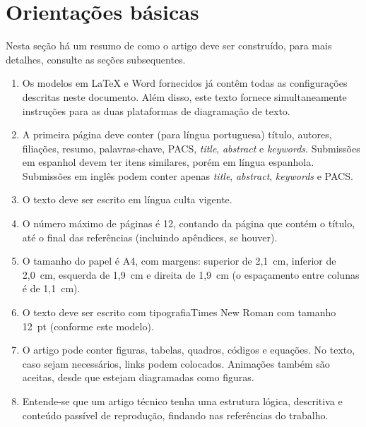 \documentclass[12pt, a4paper, twoside, twocolumn]{article}
\begin{document}
\section{Orientações básicas}

Nesta seção há um resumo de como o artigo deve ser construído, para mais detalhes, consulte as seções subsequentes.

\vspace{-8pt}
\begin{enumerate} \itemsep=2pt
    \item Os modelos em LaTeX e Word fornecidos já contêm todas as configurações descritas neste documento. Além disso, este texto fornece simultaneamente instruções para as duas plataformas de diagramação de texto.
	\item A primeira página deve conter (para língua portuguesa) título, autores, filiações, resumo, palavras-chave, PACS, \textit{title}, \textit{abstract} e \textit{keywords}.
	Submissões em espanhol devem ter itens similares, porém em língua espanhola. Submissões em inglês podem conter apenas \textit{title}, \textit{abstract}, \textit{keywords} e PACS.
	\item O texto deve ser escrito em língua culta vigente.
	\item O número máximo de páginas é 12, contando da página que contém o título, até o final das referências (incluindo apêndices, se houver).
	\item O tamanho do papel é A4, com margens: superior de 2,1~cm, inferior de 2,0~cm, esquerda de 1,9~cm e direita de 1,9~cm (o espaçamento entre colunas é de 1,1~cm).
	\item O texto deve ser escrito com tipografia\linebreak Times New Roman com tamanho 12~pt (conforme este modelo).
	\item O artigo pode conter figuras, tabelas, quadros, códigos e equações. No texto, caso sejam necessários, links podem colocados. Animações também são aceitas, desde que estejam diagramadas como figuras.
	\item Entende-se que um artigo técnico tenha uma estrutura lógica, descritiva e conteúdo passível de reprodução, findando nas referências do trabalho.
\end{enumerate}
\end{document}
